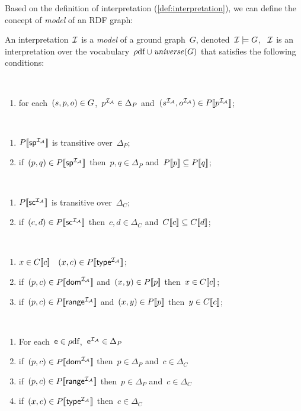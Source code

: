 Based on the definition of interpretation (\cref{def:interpretation}), we can define the concept of
\emph{model} of an \ac{RDF} graph:
%
\begin{definition}
  \label{def:rdf-model}
  An interpretation~$\mathcal{I}$ is a \emph{model} of a ground graph~$G$, denoted~$\mathcal{I} \models G$, \iff~$\mathcal{I}$ is an interpretation
  over the vocabulary~$\mbox{$\rho$df} \cup \mathit{universe}(G)$ that satisfies the following conditions:
  \begin{description}\label{condRDF}
  \item[Simple:] \
    \begin{enumerate}
    \item for each~$(s, p, o) \in G$,~${p}^{\mathcal{I}_{\mathcal{A}}} \in\Delta_{P}$ and~$(\intA{s}, \intA{o}) \in \intP{\intA{p}}$;
    \end{enumerate}
  \item[Subproperty:] \
    \begin{enumerate}
    \item ${P[\![{ \mathsf{sp}}^{\mathcal{I}_{\mathcal{A}}}]\!]}$ is transitive over~$\Delta_{P}$;
    \item if~$(p, q) \in \intP{\intA{ \spp}}$ then~$p, q \in \Delta_{P}$ and~${P[\![p]\!]} \subseteq {P[\![q]\!]}$;
    \end{enumerate}
  \item[Subclass:] \
    \begin{enumerate}
    \item ${P[\![{\mathsf{sc}}^{\mathcal{I}_{\mathcal{A}}}]\!]}$ is transitive over~$\Delta_{C}$;
    \item if~$(c, d) \in \intP{\intA{\subclass}}$ then~$c, d \in \Delta_{C}$ and~${C[\![c]\!]} \subseteq {C[\![d]\!]}$;
    \end{enumerate}
  \item[Typing I:] \
    \begin{enumerate}
    \item $x \in {C[\![c]\!]}$ \iff~$(x,c) \in \intP{\intA{\typeR}}$;
    \item if~$(p, c) \in \intP{\intA{\domR}}$ and~$(x, y) \in {P[\![p]\!]}$ then~$x \in {C[\![c]\!]}$;
    \item if~$(p, c) \in \intP{\intA{\range}}$ and~$(x, y) \in {P[\![p]\!]}$ then~$y \in {C[\![c]\!]}$;
    \end{enumerate}
  \item[Typing II:] \
    \begin{enumerate}
    \item For each~$\mathsf{e} \in \mbox{$\rho$df}$,~${\mathsf{e}}^{\mathcal{I}_{\mathcal{A}}} \in \Delta_{P}$
    \item if~$(p, c) \in \intP{\intA{\domR}}$ then~$p \in \Delta_{P}$ and~$c \in \Delta_{C}$
    \item if~$(p, c) \in \intP{\intA{\range}}$ then~$p \in \Delta_{P}$ and~$c \in \Delta_{C}$
    \item if~$(x, c) \in \intP{\intA{\typeR}}$ then~$c \in \Delta_{C}$
    \end{enumerate}
  \end{description}
\end{definition}

